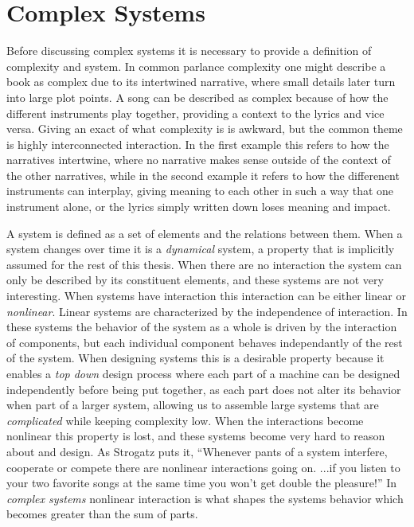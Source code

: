 \section{Complex Systems}
%
Before discussing complex systems it is necessary to provide a definition of
complexity and system.
In common parlance complexity one might describe a book as complex due to its
intertwined narrative, where small details later turn into large plot points.
A song can be described as complex because of how the different instruments play
together, providing a context to the lyrics and vice versa.
Giving an exact of what complexity is is awkward, but the common theme is
highly interconnected interaction.
In the first example this refers to how the narratives intertwine, where no
narrative makes sense outside of the context of the other narratives, while in
the second example it refers to how the differenent instruments can interplay,
giving meaning to each other in such a way that one instrument alone, or the
lyrics simply written down loses meaning and impact.
\par
%
A system is defined as a set of elements and the relations between them.
When a system changes over time it is a \emph{dynamical} system, a property that
is implicitly assumed for the rest of this thesis.
When there are no interaction the system can only be described by its
constituent elements, and these systems are not very interesting.
When systems have interaction this interaction can be either linear or
\emph{nonlinear}.
Linear systems are characterized by the independence of interaction.
In these systems the behavior of the system as a whole is driven by the
interaction of components, but each individual component behaves independantly
of the rest of the system.
When designing systems this is a desirable property because it enables a
\emph{top down} design process where each part of a machine can be designed
independently before being put together, as each part does not alter its
behavior when part of a larger system, allowing us to assemble large systems
that are \emph{complicated} while keeping complexity low.
When the interactions become nonlinear this property is lost, and these systems
become very hard to reason about and design.
As Strogatz puts it, ``Whenever pants of a system interfere, cooperate or
compete there are nonlinear interactions going on. ...if you listen to your two
favorite songs at the same time you won't get double the pleasure!''
\cite{strogatz2014}
In \emph{complex systems} nonlinear interaction is what shapes the systems
behavior which becomes greater than the sum of parts.
%
